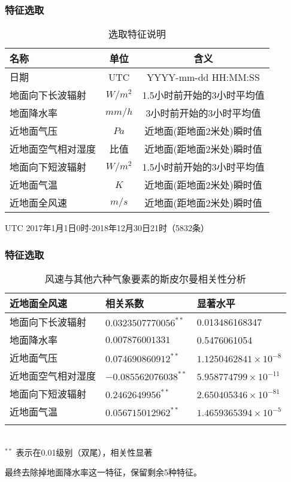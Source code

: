 \documentclass[14pt, AutoFakeBold]{ppt}
\begin{document}
\begin{frame}
  \frametitle{特征选取}
  \begin{table}[H]
    \centering
    \caption{选取特征说明}
    \begin{tabular}{lcc}
    \toprule
    名称 & 单位 & 含义 \\
    \midrule
    日期 & UTC & YYYY-mm-dd HH:MM:SS \\
    地面向下长波辐射 & $W/m^2$ & 1.5小时前开始的3小时平均值 \\
    地面降水率 & $mm/h$ & 3小时前开始的3小时平均值 \\
    近地面气压 & $Pa$ & 近地面(距地面2米处)瞬时值 \\
    近地面空气相对湿度 & 比值 & 近地面(距地面2米处)瞬时值 \\
    地面向下短波辐射 & $W/m^2$ & 1.5小时前开始的3小时平均值 \\
    近地面气温 & $K$ & 近地面(距地面2米处)瞬时值 \\
    近地面全风速 & $m/s$ & 近地面(距地面2米处)瞬时值 \\
    \bottomrule
    \end{tabular}
    \label{features}
\end{table}
UTC 2017年1月1日0时-2018年12月30日21时（5832条）
\end{frame}

\begin{frame}
  \frametitle{特征选取}
  \begin{table}[H]
    \centering
    \caption{风速与其他六种气象要素的斯皮尔曼相关性分析}
    \begin{tabular}{lll}
    \toprule
    近地面全风速 & 相关系数 & 显著水平 \\
    \midrule
    地面向下长波辐射 & $0.0323507770056^{**}$ & 0.013486168347 \\
    地面降水率 & $0.007876001331$ & 0.5476061054 \\
    近地面气压 & $0.074690860912^{**}$ & $1.1250462841\times10^{-8}$ \\
    近地面空气相对湿度 & $-0.085562076038^{**}$ & $5.958774799\times10^{-11}$ \\
    地面向下短波辐射 & $0.2462649956^{**}$ & $2.650405346\times10^{-81}$ \\
    近地面气温 & $0.056715012962^{**}$ & $1.4659365394\times10^{-5}$ \\
    \bottomrule \\
    \end{tabular} \\
    \footnotesize{$^{**}$ 表示在0.01级别（双尾），相关性显著} \\
    \label{relativity-analysis}
\end{table}
最终去除掉地面降水率这一特征，保留剩余5种特征。
\end{frame}
\end{document}
